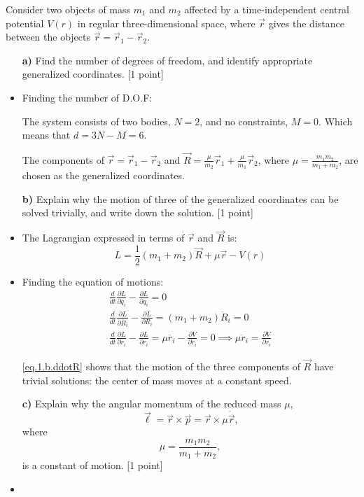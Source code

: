 \documentclass[11pt,a4paper]{report}
\newcounter{excount}[chapter]
\newenvironment{exercise}[1][]{\addtocounter{excount}{1} \noindent {\bf Question
    \arabic{excount} \ \ #1}\hspace{2mm}}{\vspace{4mm}}
\begin{document}
\begin{exercise}{\bf Central potentials\\}
Consider two objects of mass $m_1$ and $m_2$ affected by a time-independent central potential $V(r)$ in regular three-dimensional space, where $\vec r$ gives the distance between the objects $\vec r = \vec r_1- \vec r_2$.

\begin{itemize}
\item[{\bf a)}] Find the number of degrees of freedom, and identify appropriate generalized coordinates. [1 point]
\item Finding the number of D.O.F: \par
The system consists of two bodies, $N=2$, and no constraints, $M=0$. Which means that $d=3N-M=6$. \par 
 The components of $\vec{r}=\vec{r}_1-\vec{r}_2$ and $\vec{R}=\frac{\mu}{m_2}\vec{r}_1+\frac{\mu}{m_1}\vec{r}_2$, where $\mu=\frac{m_1m_2}{m_1+m_2}$, are chosen as the generalized coordinates.

\item[{\bf b)}] Explain why the motion of three of the generalized coordinates can be solved trivially, and write down the solution. [1 point]



\item The Lagrangian expressed in terms of $\vec{r}$ and $\vec{R}$ is:
\begin{equation}
L=\frac{1}{2}(m_1+m_2)\vec{R}+\mu\vec{r}-V(r)
\end{equation}
\item Finding the equation of motions:
\begin{align}
\frac{d}{dt} \frac{\partial L}{\partial \dot{q_i}}-\frac{\partial L}{\partial q_i}=0 \\
\frac{d}{dt} \frac{\partial L}{\partial \dot{R_i}}-\frac{\partial L}{\partial R_i}=(m_1+m_2)\ddot{R}_i=0 \label{eq.1.b.ddotR}\\
\frac{d}{dt} \frac{\partial L}{\partial \dot{r_i}}-\frac{\partial L}{\partial r_i}=\mu \ddot{r_i}-\frac{\partial V}{\partial r_i}=0 \implies \mu\ddot{r}_i=\frac{\partial V}{\partial r_i}
\end{align}

\eqref{eq.1.b.ddotR} shows that the motion of the three components of $\vec{R}$ have trivial solutions: the center of mass moves at a constant speed.
\item[{\bf c)}] Explain why the angular momentum of the reduced mass $\mu$,
\begin{equation}
\vec\ell = \vec r \times \vec p= \vec r \times \mu\dot{\vec r},
\end{equation}
where
\begin{equation}
\mu= \frac{m_1m_2}{m_1+m_2},
\end{equation}
is a constant of motion.
[1 point]
\item 



\end{itemize}
\end{exercise}
\end{document}
